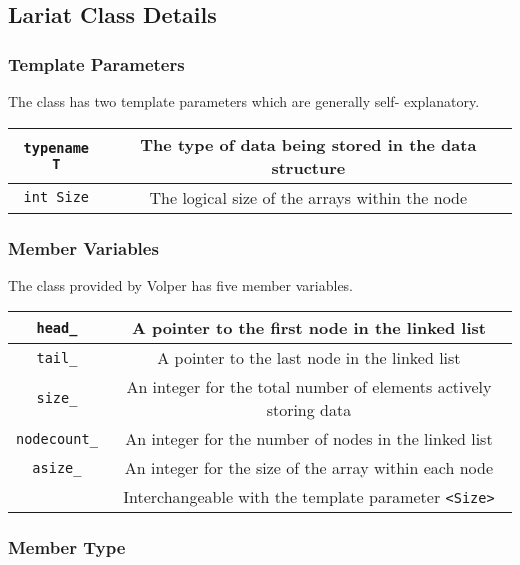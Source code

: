 \subsection{Lariat Class Details}


\subsubsection{Template Parameters}
\indent The  class has two template parameters which are generally self-
explanatory.
\\

\begin{tabular}{|c|c|}
	\hline
	\texttt{typename T} & The type of data being stored in the data structure \\
	\hline
	\texttt{int Size}   & The logical size of the arrays within the node      \\
	\hline
\end{tabular}



\subsubsection{Member Variables}
\indent The  class provided by Volper has five member variables.
\\


\begin{tabular}{|c|c|}
	\hline
	\texttt{head_}      & A pointer to the first node in the linked list                       \\
	\hline
	\texttt{tail_}      & A pointer to the last node in the linked list                        \\
	\hline
	\texttt{size_}      & An integer for the total number of elements actively storing data    \\
	\hline
	\texttt{nodecount_} & An integer for the number of nodes in the linked list                \\
	\hline
	\texttt{asize_}     & An integer for the size of the array within each node                \\
	                             & Interchangeable with the template parameter \texttt{<Size>} \\
	\hline
\end{tabular}


\subsubsection{Member Type}

